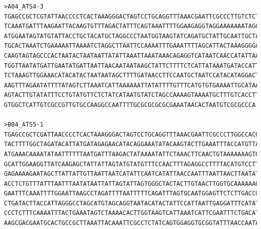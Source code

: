 \begin{verbatim}
>A04_ATS4-3
TGAGCCGCTCGTATTAACCCCTCACTAAAGGGACTAGTCCTGCAGGTTTAAACGAATTCGCCCTTGTCTCTTTCTGTGTCTCAGCTTCCTCATCCTTAGGATGCCAGTATATTTCAGAAT
TCAAATGATTTAAGAATTACAAGTGTTTAGACTATTTCAGTAAATTTTGGAAGAGGTAGGAAAAAAATAGGAGGTGAAGATGAGCAAAATGCATTGTATCATATATGAAATCCTCAATTA
ATGGAATAGTATGTATTACCTGCTACATGCTAGGCCCTAATGGTAAGTATCAGATGCTATTGCAATTGCTATAATTTCTATCATTTGCATGAGTATATGACTTGGTCAAGAGAACTCCAT
TGCACTAAATCTGAAAAATTAAAATCTAGGCTTAATTCCAAAATTTGAAATTTTAGCATTACTAAAGGGGAGACAGCAGAGAAAATGTTTGAAACTGACCAGCTTTTTTGCACCAAGTTA
CAAGTAGTAGCCCACTAATACTAATAATTATATTAAATTAAATAAACAGAGGTCATAATCAACCATATTAAGTTGACTAATTTGATTAATGTGCGTTTATTAATATTAAGTTAATTAAAT
TGGTTAATATGATTGAATATGATTAATTAACAATAATAAGCTATTCTTTTCTCATTATAAATGATACCATTGAATGCCAAATGCAGGGCATATAAATTCATTAAGGACATGTAAAAGGCC
TCTAAAGTTGGAAACATACATACTAATAATAGCTTTTGATAACCTTCCAATGCTAATCCATACATAGGACTGGTCACTAAATCATACCTCATGTGTCAAATCTACTTTTTTTTACAGTTG
AAGTTTAGAATATTTTATAGTCTTAAATCATTAAAAAATTATATTTTGTTTCATGTGTGAAAATTGCATAAAACTTAAATGTCTATGTCCATAATTTCTAATGTAACATGGTAAATTTCA
AGTACTTGTATATTTCCTGTATGTTCTCTATCATAATGTATCTAGCCAAAAGTAAAATGCTTTGTCACCTTGAATGAACAATAACTATAATAGAGATAATATAAAAGACAATACACTATA
GTGGCTCATTGTCGCCGTTGTGCCAAGGCCAATTTTGCGCGCGCGCGAAATAACACTAATGTCGCGCCCA

>B04_ATS5-1
TGAGCCGCTCGATTAACCCCTCACTAAAGGGACTAGTCCTGCAGGTTTAAACGAATTCGCCCTTGGCCACGCGTCGACTAGTACTTTTTTTTTTTTTTTTTTTAAGGTGACAAAGCATTT
TACTTTTGGCTAGATACATTATGATAGAGAACATACAGGAAATATACAAGTACTTGAAATTTACCATGTTACATTAAAAATTATGGACATAGACATTTAAGTTTTATGCAATTTTCACAC
ATGAAACAAAATATAATTTTTTAATGATTTAAGACTATAAAATATTCTAAACTTCAACTGTAAAAAAAGTGGATTTGACACATGAGGTATGATTTAGTGACCAGTCCTATGTATGGATTA
GCATTGGAAGGTTATCAAGAGCTATTATTAGTATGTATGTTTCCAACTTTAGAGGCCTTTTACATGTCCTTAATGAATTTATATGCCCTGCATTTGGCATTCAATGGTATCATTTATAAT
GAGAAAAGAATAGCTTATTATTGTTAATTAATCATATTCAATCATATTAACCAATTTAATTAACTTAATATTAATAAACGCACATTAATCAAATTAGTCAACTTAATATGGTTGATTATG
ACCTCTGTTTATTTAATTTAATATAATTATTAGTATTAGTGGGCTACTACTTGTAACTTGGTGCAAAAAAGCTGGTCAGTTTCAAACATTTTCTCTGCTGTCCCCCCTTTAGTAATGCTA
GAATTTCAAATTTTGGAATTAAGCCTAGATTTTAATTTTTCAGATTTAGTGCAATGGAGTTCTCTTGACCGAGTCATATACTCATGCAAATGATAGAAATTATAGCAATTGCAATAGCAT
CTGATACTTACCATTAGGGCCTAGCATGTAGCAGGTAATACATACTATTCCATTAATTGAGGATTTCATATATGATACAATGCATTTTGCTCATCTTCACCCTCCCTATTTTTTTTCCTA
CCCTCTTTCAAAATTTACTGAAATAGTCTAAAACACTTGGTAAGTCATTAAATCATTCGAATTTCTGACATAATACCTGCATCCCTACGGATGAGGAAGCTGACTACACCAGCAAGAGAC
AAGCGACGAATGCACTGCCGCTTAAATTACAAATTCGCCTCTATCAGTGGAGGTGCGGTATTTAACCAATATTCCAACTTGGAGACACT


\end{verbatim}
